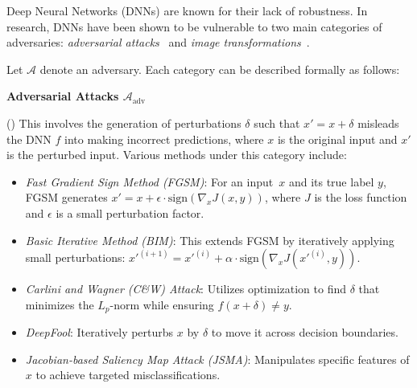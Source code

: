\documentclass[10pt, conference, a4paper, final]{IEEEtran}
\begin{document}

Deep Neural Networks (DNNs) are known for their lack of robustness. In research, DNNs have been shown to be vulnerable to two main categories of adversaries: \emph{adversarial attacks}~\cite{adv_attacks} and \emph{image transformations}~\cite{deeptest}.

Let $\mathcal{A}$ denote an adversary. Each category can be described formally as follows:

\smallskip\noindent%
\textbf{Adversarial Attacks $\mathcal{A}_{\text{adv}}$}

(\adv) This involves the generation of perturbations $\delta$ such that $x' = x + \delta$ misleads the DNN $f$ into making incorrect predictions, where $x$ is the original input and $x'$ is the perturbed input. Various methods under this category include:
\begin{itemize}[$\bullet$]
    \item \emph{Fast Gradient Sign Method (FGSM)}: For an input~$x$ and its true label $y$, FGSM generates $x' = x + \epsilon \cdot \text{sign}(\nabla_x J(x, y))$, where $J$ is the loss function and $\epsilon$ is a small perturbation factor.
    \item \emph{Basic Iterative Method (BIM)}: This extends FGSM by iteratively applying small perturbations: $x'^{(i+1)} = x'^{(i)} + \alpha \cdot \text{sign}(\nabla_x J(x'^{(i)}, y))$.
    \item \emph{Carlini and Wagner (C\&W) Attack}: Utilizes optimization to find $\delta$ that minimizes the $L_p$-norm while ensuring $f(x + \delta) \neq y$.
    \item \emph{DeepFool}: Iteratively perturbs $x$ by $\delta$ to move it across decision boundaries.
    \item \emph{Jacobian-based Saliency Map Attack (JSMA)}: Manipulates specific features of $x$ to achieve targeted misclassifications.
\end{itemize}
\end{document}
